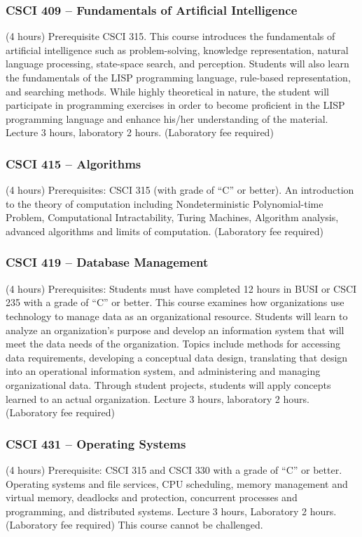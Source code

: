 \subsubsection{CSCI 409 -- Fundamentals of Artificial Intelligence}
(4 hours) Prerequisite CSCI 315. This course introduces the fundamentals of artificial intelligence such as problem-solving, knowledge representation, natural language processing, state-space search, and perception. Students will also learn the fundamentals of the LISP programming language, rule-based representation, and searching methods. While highly theoretical in nature, the student will participate in programming exercises in order to become proficient in the LISP programming language and enhance his/her understanding of the material. Lecture 3 hours, laboratory 2 hours. (Laboratory fee required)

\subsubsection{CSCI 415 -- Algorithms}
(4 hours) Prerequisites: CSCI 315 (with grade of “C” or better). An introduction to the theory of computation including Nondeterministic Polynomial-time Problem, Computational Intractability, Turing Machines, Algorithm analysis, advanced algorithms and limits of computation. (Laboratory fee required)

\subsubsection{CSCI 419 -- Database Management}
(4 hours) Prerequisites: Students must have completed 12 hours in BUSI or CSCI 235 with a grade of “C” or better. This course examines how organizations use technology to manage data as an organizational resource. Students will learn to analyze an organization’s purpose and develop an information system that will meet the data needs of the organization. Topics include methods for accessing data requirements, developing a conceptual data design, translating that design into an operational information system, and administering and managing organizational data. Through student projects, students will apply concepts learned to an actual organization. Lecture 3 hours, laboratory 2 hours. (Laboratory fee required)

\subsubsection{CSCI 431 -- Operating Systems}
(4 hours) Prerequisite: CSCI 315 and CSCI 330 with a grade of “C” or better. Operating systems and file services, CPU scheduling, memory management and virtual memory, deadlocks and protection, concurrent processes and programming, and distributed systems. Lecture 3 hours, Laboratory 2 hours. (Laboratory fee required) This course cannot be challenged.

